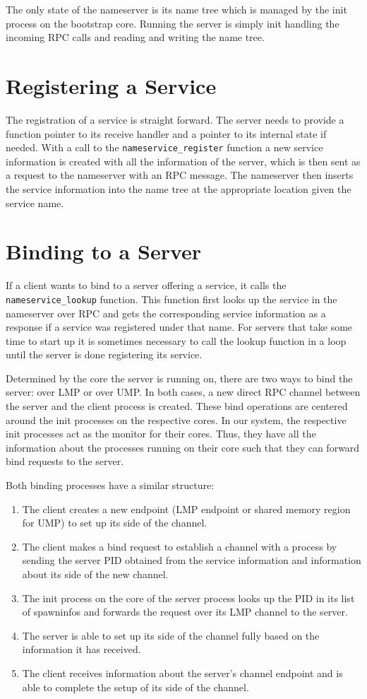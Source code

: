 The only state of the nameserver is its name tree which is managed by the init process on the bootstrap core.
Running the server is simply init handling the incoming RPC calls and reading and writing the name tree.

\section{Registering a Service}
The registration of a service is straight forward. The server needs to provide a function pointer to its
receive handler and a pointer to its internal state if needed. With a call to the \texttt{nameservice_register}
function a new service information is created with all the information of the server, which is then sent
as a request to the nameserver with an RPC message. The nameserver then inserts the service information
into the name tree at the appropriate location given the service name.

\section{Binding to a Server}
If a client wants to bind to a server offering a service, it calls the \texttt{nameservice_lookup}
function. This function first looks up the service in the nameserver over RPC and gets the corresponding 
service information as a response if a service was registered under that name. For servers that take some
time to start up it is sometimes necessary to call the lookup function in a loop until the server is done
registering its service.

Determined by the core the server is running on, there are two ways to bind the server: over LMP or over UMP.
In both cases, a new direct RPC channel between the server and the client process is created. These bind
operations are centered around the init processes on the respective cores. In our system, the respective
init processes act as the monitor for their cores. Thus, they have all the information about the processes
running on their core such that they can forward bind requests to the server.

Both binding processes have a similar structure:
\begin{enumerate}
    \item The client creates a new endpoint (LMP endpoint or shared memory region for UMP) to set up its side
        of the channel.
    \item The client makes a bind request to establish a channel with a process by sending the server PID
        obtained from the service information and information about its side of the new channel.
    \item The init process on the core of the server process looks up the PID in its list of spawninfos
        and forwards the request over its LMP channel to the server.
    \item The server is able to set up its side of the channel fully based on the information it has received.
    \item The client receives information about the server's channel endpoint and is able to complete the
        setup of its side of the channel.
\end{enumerate}

